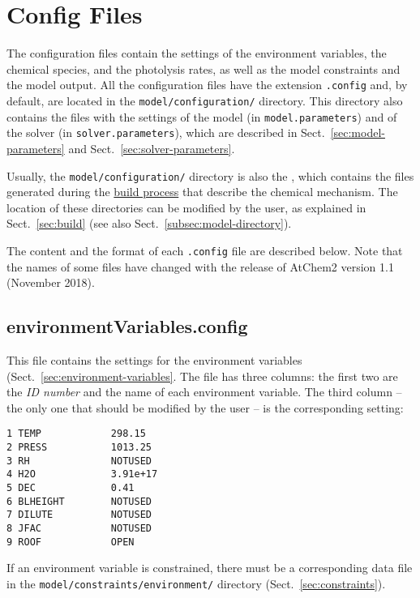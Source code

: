\section{Config Files} \label{sec:config-files}

The configuration files contain the settings of the environment
variables, the chemical species, and the photolysis rates, as well as
the model constraints and the model output. All the configuration
files have the extension \texttt{.config} and, by default, are located
in the \texttt{model/configuration/} directory. This directory also
contains the files with the settings of the model (in
\texttt{model.parameters}) and of the solver (in
\texttt{solver.parameters}), which are described in
Sect.~\ref{sec:model-parameters} and Sect.~\ref{sec:solver-parameters}.

Usually, the \texttt{model/configuration/} directory is also the
\sharedir, which contains the files generated during the
\hyperref[subsec:build-process]{build process} that describe the chemical
mechanism. The location of these directories can be modified by the
user, as explained in Sect.~\ref{sec:build} (see also
Sect.~\ref{subsec:model-directory}).   

The content and the format of each \texttt{.config} file are described
below. Note that the names of some files have changed with the release
of AtChem2 version 1.1 (November 2018).

\subsection{environmentVariables.config} \label{subsec:environmentvariables}

This file contains the settings for the environment variables
(Sect.~\ref{sec:environment-variables}. The file has three columns:
the first two are the \emph{ID number} and the name of each
environment variable. The third column -- the only one that should be
modified by the user -- is the corresponding setting:

\begin{verbatim}
1 TEMP            298.15
2 PRESS           1013.25
3 RH              NOTUSED
4 H2O             3.91e+17
5 DEC             0.41
6 BLHEIGHT        NOTUSED
7 DILUTE          NOTUSED
8 JFAC            NOTUSED
9 ROOF            OPEN
\end{verbatim}

If an environment variable is constrained, there must be a
corresponding data file in the \texttt{model/constraints/environment/}
directory (Sect.~\ref{sec:constraints}).

